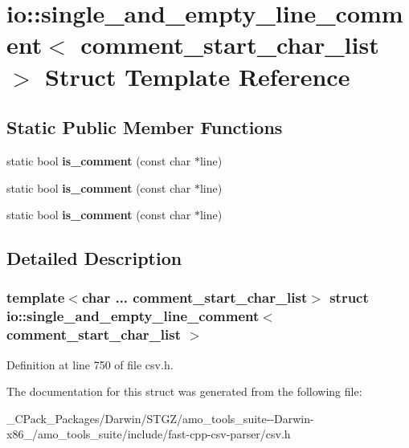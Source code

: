 \hypertarget{structio_1_1single__and__empty__line__comment}{}\section{io\+:\+:single\+\_\+and\+\_\+empty\+\_\+line\+\_\+comment$<$ comment\+\_\+start\+\_\+char\+\_\+list $>$ Struct Template Reference}
\label{structio_1_1single__and__empty__line__comment}
\subsection*{Static Public Member Functions}
\begin{DoxyCompactItemize}
\item 
\mbox{\label{structio_1_1single__and__empty__line__comment_a93a1556dfe4d7e6e3a674d576c4b30f4}} 
static bool {\bfseries is\+\_\+comment} (const char $\ast$line)
\item 
\mbox{\label{structio_1_1single__and__empty__line__comment_a93a1556dfe4d7e6e3a674d576c4b30f4}} 
static bool {\bfseries is\+\_\+comment} (const char $\ast$line)
\item 
\mbox{\label{structio_1_1single__and__empty__line__comment_a93a1556dfe4d7e6e3a674d576c4b30f4}} 
static bool {\bfseries is\+\_\+comment} (const char $\ast$line)
\end{DoxyCompactItemize}


\subsection{Detailed Description}
\subsubsection*{template$<$char ... comment\+\_\+start\+\_\+char\+\_\+list$>$\newline
struct io\+::single\+\_\+and\+\_\+empty\+\_\+line\+\_\+comment$<$ comment\+\_\+start\+\_\+char\+\_\+list $>$}



Definition at line 750 of file csv.\+h.



The documentation for this struct was generated from the following file\+:\begin{DoxyCompactItemize}
\item 
\+\_\+\+C\+Pack\+\_\+\+Packages/\+Darwin/\+S\+T\+G\+Z/amo\+\_\+tools\+\_\+suite-\/-\/\+Darwin-\/x86\+\_/amo\+\_\+tools\+\_\+suite/include/fast-\/cpp-\/csv-\/parser/csv.\+h\end{DoxyCompactItemize}
